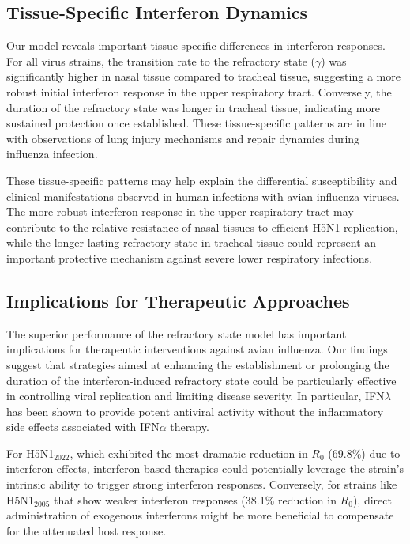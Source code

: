 \documentclass[12pt]{article}
\begin{document}
\subsection{Tissue-Specific Interferon Dynamics}
Our model reveals important tissue-specific differences in interferon responses. For all virus strains, the transition rate to the refractory state ($\gamma$) was significantly higher in nasal tissue compared to tracheal tissue, suggesting a more robust initial interferon response in the upper respiratory tract. Conversely, the duration of the refractory state was longer in tracheal tissue, indicating more sustained protection once established. These tissue-specific patterns are in line with observations of lung injury mechanisms and repair dynamics during influenza infection.

These tissue-specific patterns may help explain the differential susceptibility and clinical manifestations observed in human infections with avian influenza viruses. The more robust interferon response in the upper respiratory tract may contribute to the relative resistance of nasal tissues to efficient H5N1 replication, while the longer-lasting refractory state in tracheal tissue could represent an important protective mechanism against severe lower respiratory infections.

\subsection{Implications for Therapeutic Approaches}
The superior performance of the refractory state model has important implications for therapeutic interventions against avian influenza. Our findings suggest that strategies aimed at enhancing the establishment or prolonging the duration of the interferon-induced refractory state could be particularly effective in controlling viral replication and limiting disease severity. In particular, IFN$\lambda$ has been shown to provide potent antiviral activity without the inflammatory side effects associated with IFN$\alpha$ therapy.

For H5N1$_{2022}$, which exhibited the most dramatic reduction in $R_0$ (69.8\%) due to interferon effects, interferon-based therapies could potentially leverage the strain's intrinsic ability to trigger strong interferon responses. Conversely, for strains like H5N1$_{2005}$ that show weaker interferon responses (38.1\% reduction in $R_0$), direct administration of exogenous interferons might be more beneficial to compensate for the attenuated host response.
\end{document}
